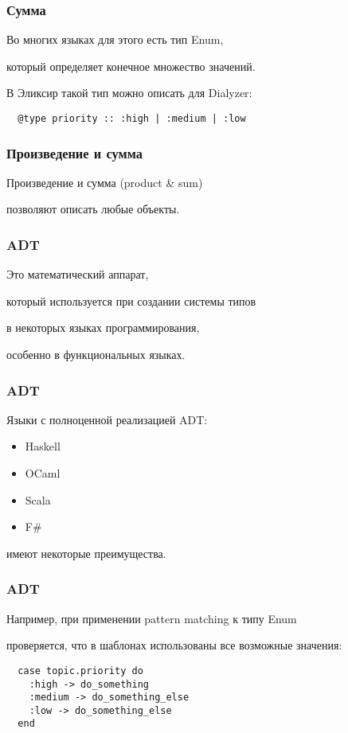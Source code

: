 \documentclass[10pt]{beamer}
\begin{document}
\begin{frame}[fragile]
  \frametitle{Сумма}
  Во многих языках для этого есть тип Enum,
  \par \bigskip
  который определяет конечное множество значений.
  \par \bigskip
  В Эликсир такой тип можно описать для Dialyzer:
  \par \bigskip
  \begin{lstlisting}
  @type priority :: :high | :medium | :low
  \end{lstlisting}
\end{frame}

\begin{frame}
  \frametitle{Произведение и сумма}
  Произведение и сумма (product \& sum)
  \par \bigskip
  позволяют описать любые объекты.
\end{frame}

\begin{frame}
  \frametitle{ADT}
  Это математический аппарат,
  \par \bigskip
  который используется при создании системы типов
  \par \bigskip
  в некоторых языках программирования,
  \par \bigskip
  особенно в функциональных языках.
\end{frame}

\begin{frame}
  \frametitle{ADT}
  Языки с полноценной реализацией ADT:
  \par \bigskip
  \begin{itemize}
  \item Haskell
  \item OCaml
  \item Scala
  \item F\#
  \end{itemize}
  \par \bigskip
  имеют некоторые преимущества.
\end{frame}

\begin{frame}[fragile]
  \frametitle{ADT}
  Например, при применении pattern matching к типу Enum
  \par \bigskip
  проверяется, что в шаблонах использованы все возможные значения:
  \par \bigskip
  \begin{lstlisting}
  case topic.priority do
    :high -> do_something
    :medium -> do_something_else
    :low -> do_something_else
  end
  \end{lstlisting}
\end{frame}
\end{document}
